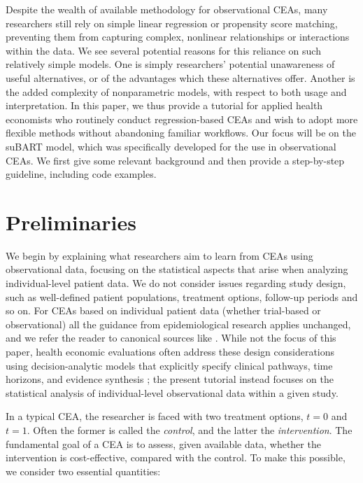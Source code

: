 \documentclass[aoas,preprint]{imsart}
\theoremstyle{plain}
\theoremstyle{definition}
\theoremstyle{remark}
\theoremstyle{remark}
\begin{document}
Despite the wealth of available methodology for observational CEAs, many researchers still rely on simple linear regression or propensity score matching, preventing them from capturing complex, nonlinear relationships or interactions within the data.
We see several potential reasons for this reliance on such relatively simple models. One is simply researchers' potential unawareness of useful alternatives, or of the advantages which these alternatives offer. Another is the added complexity of nonparametric models, with respect to both usage and interpretation.
In this paper, we thus provide a tutorial for applied health economists who routinely conduct regression-based CEAs and wish to adopt more flexible methods without abandoning familiar workflows. Our focus will be on the suBART model, which was specifically developed for the use in observational CEAs. We first give some relevant background and then provide a step-by-step guideline, including code examples.

\section{Preliminaries}\label{sec:preliminaries}

We begin by explaining what researchers aim to learn from CEAs using observational data, focusing on the statistical aspects that arise when analyzing individual-level patient data. We do not consider issues regarding study design, such as well-defined patient populations, treatment options, follow-up periods and so on. For CEAs based on individual patient data (whether trial-based or observational) all the guidance from epidemiological research applies unchanged, and we refer the reader to canonical sources like \citet{hernan2016using}. While not the focus of this paper, health economic evaluations often address these design considerations using decision-analytic models that explicitly specify clinical pathways, time horizons, and evidence synthesis \citep{Sculpher2006}; the present tutorial instead focuses on the statistical analysis of individual-level observational data within a given study.

In a typical CEA, the researcher is faced with two treatment options, $t = 0$ and $t = 1$. Often the former is called the \emph{control}, and the latter the \emph{intervention}. The fundamental goal of a CEA is to assess, given available data, whether the intervention is cost-effective, compared with the control. To make this possible, we consider two essential quantities:
\end{document}
